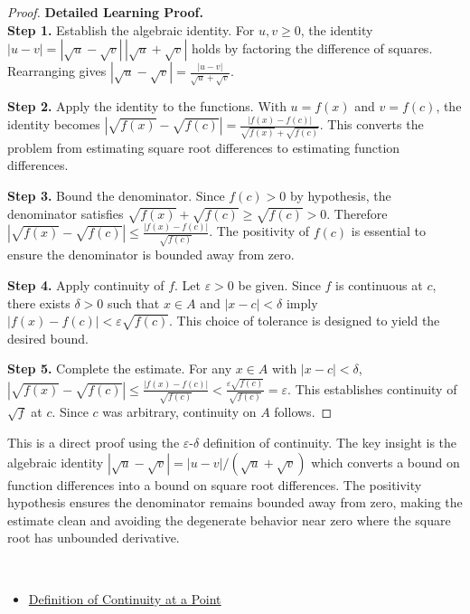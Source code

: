 \begin{proof}
\textbf{Detailed Learning Proof.}~\\

\textbf{Step 1.} Establish the algebraic identity. For $u, v \geq 0$, the identity $|u - v| = |\sqrt{u} - \sqrt{v}|\,|\sqrt{u} + \sqrt{v}|$ holds by factoring the difference of squares. Rearranging gives $|\sqrt{u} - \sqrt{v}| = \frac{|u - v|}{\sqrt{u} + \sqrt{v}}$.

\textbf{Step 2.} Apply the identity to the functions. With $u = f(x)$ and $v = f(c)$, the identity becomes $|\sqrt{f(x)} - \sqrt{f(c)}| = \frac{|f(x) - f(c)|}{\sqrt{f(x)} + \sqrt{f(c)}}$. This converts the problem from estimating square root differences to estimating function differences.

\textbf{Step 3.} Bound the denominator. Since $f(c) > 0$ by hypothesis, the denominator satisfies $\sqrt{f(x)} + \sqrt{f(c)} \geq \sqrt{f(c)} > 0$. Therefore $|\sqrt{f(x)} - \sqrt{f(c)}| \leq \frac{|f(x) - f(c)|}{\sqrt{f(c)}}$. The positivity of $f(c)$ is essential to ensure the denominator is bounded away from zero.

\textbf{Step 4.} Apply continuity of $f$. Let $\varepsilon > 0$ be given. Since $f$ is continuous at $c$, there exists $\delta > 0$ such that $x \in A$ and $|x - c| < \delta$ imply $|f(x) - f(c)| < \varepsilon\sqrt{f(c)}$. This choice of tolerance is designed to yield the desired bound.

\textbf{Step 5.} Complete the estimate. For any $x \in A$ with $|x - c| < \delta$, $|\sqrt{f(x)} - \sqrt{f(c)}| \leq \frac{|f(x) - f(c)|}{\sqrt{f(c)}} < \frac{\varepsilon\sqrt{f(c)}}{\sqrt{f(c)}} = \varepsilon$. This establishes continuity of $\sqrt{f}$ at $c$. Since $c$ was arbitrary, continuity on $A$ follows.
\end{proof}

\begin{remark*}
This is a direct proof using the $\varepsilon$-$\delta$ definition of continuity. The key insight is the algebraic identity $|\sqrt{u} - \sqrt{v}| = |u-v|/(\sqrt{u}+\sqrt{v})$ which converts a bound on function differences into a bound on square root differences. The positivity hypothesis ensures the denominator remains bounded away from zero, making the estimate clean and avoiding the degenerate behavior near zero where the square root has unbounded derivative.
\end{remark*}

\begin{remark*}[Dependencies]~\\
\begin{itemize}
  \item \hyperref[def:continuous-at-point]{Definition of Continuity at a Point}
\end{itemize}
\end{remark*}
